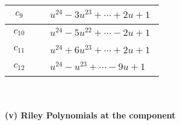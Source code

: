 \documentclass[1p]{elsarticle_modified}
\theoremstyle{definition}
\begin{document}
\begin{tabular}{m{50pt}|m{274pt}}
\hline $$\begin{aligned}c_{9}\end{aligned}$$&$\begin{aligned}
&u^{24}-3 u^{23}+\cdots+2 u+1
\end{aligned}$\\
\hline $$\begin{aligned}c_{10}\end{aligned}$$&$\begin{aligned}
&u^{24}-5 u^{22}+\cdots-2 u+1
\end{aligned}$\\
\hline $$\begin{aligned}c_{11}\end{aligned}$$&$\begin{aligned}
&u^{24}+6 u^{23}+\cdots+2 u+1
\end{aligned}$\\
\hline $$\begin{aligned}c_{12}\end{aligned}$$&$\begin{aligned}
&u^{24}- u^{23}+\cdots-9 u+1
\end{aligned}$\\
\hline
\end{tabular}\\~\\
\newpage\renewcommand{\arraystretch}{1}
\flushleft \textbf{(v) Riley Polynomials at the component}\newline \\
\end{document}
